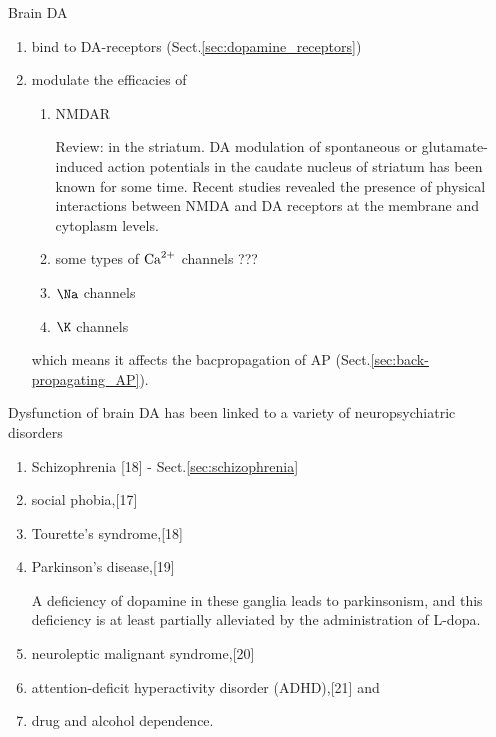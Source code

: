 Brain DA
\begin{enumerate}
  \item bind to DA-receptors (Sect.\ref{sec:dopamine_receptors})
  
  
  \item modulate the efficacies of 
  \begin{enumerate}
    \item NMDAR
    
Review: \citep{cepeda2009} in the striatum.
 DA modulation of spontaneous or glutamate-induced action potentials in the
 caudate nucleus of striatum has been known for some time.
Recent studies revealed the presence of physical interactions between NMDA and
DA receptors at the membrane and cytoplasm levels.
    
    \item some types of ${\text{Ca}^{2+}}$ channels ???
    
    \item $\Na$ channels
    \item $\K$ channels 
  \end{enumerate}
  which means it affects the bacpropagation of AP
  (Sect.\ref{sec:back-propagating_AP}).
\end{enumerate}


Dysfunction of brain DA has been linked to a variety of neuropsychiatric
disorders \citep{emilien1999}
\begin{enumerate}
  \item Schizophrenia [18] - Sect.\ref{sec:schizophrenia}
  
  \item social phobia,[17] 
  
  \item Tourette's syndrome,[18] 
  
  \item Parkinson's disease,[19]

A deficiency of dopamine in these ganglia leads to parkinsonism, and this
deficiency is at least partially alleviated by the administration of L-dopa.
  
  \item neuroleptic malignant syndrome,[20] 
  
  \item attention-deficit hyperactivity disorder (ADHD),[21] and 
  
  \item drug and  alcohol dependence.
  
\end{enumerate}



